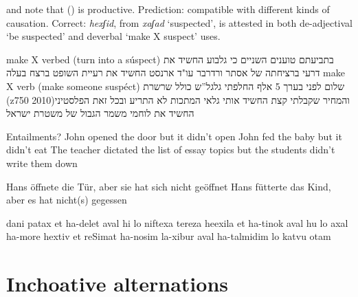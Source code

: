 \pex \cite{lev16} and \cite{kastner18tlr} note that {\thif} (\vd) is productive.
	\a Prediction: compatible with different kinds of causation.
	\a Correct: \emph{hexʃid}, from \emph{xaʃad} `suspected', is attested in both de-adjectival `be suspected' and deverbal `make X suspect' uses.
\xe	

make X verbed (turn into a súspect)
בתביעתם טוענים השניים כי גלבוע החשיד את דרעי ברציחתה של אסתר ורדרבר
עו"ד ארנסט החשיד את רעיית השופט ברצח בעלה
make X verb (make someone suspéct)
שלום לפני בערך 5 אלף החלפתי גלגל''ש כולל שרשרת (z750 2010)והמחיר שקבלתי קצת החשיד אותי
גלאי המתכות לא התריע ובכל זאת הפלסטיני החשיד את לוחמי משמר הגבול של משטרת ישראל


Entailments?
	John opened the door but it didn't open
	John fed the baby but it didn't eat
	The teacher dictated the list of essay topics but the students didn't write them down
	
	Hans öffnete die Tür, aber sie hat sich nicht geöffnet
	Hans fütterte das Kind, aber es hat nicht(s) gegessen
	
	
	dani patax et ha-delet aval hi lo niftexa
	tereza heexila et ha-tinok aval hu lo axal
	ha-more hextiv et reSimat ha-nosim la-xibur aval ha-talmidim lo katvu otam
	

\section{Inchoative alternations}



